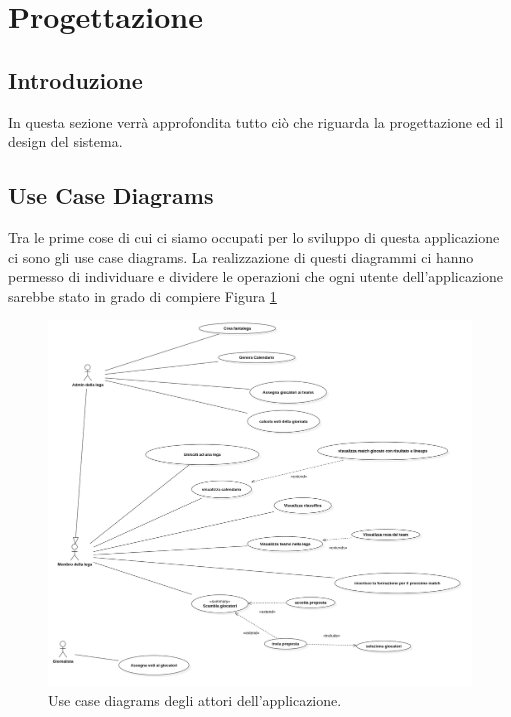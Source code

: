 \section{Progettazione}
\subsection{Introduzione}
In questa sezione verrà approfondita tutto ciò che riguarda la progettazione ed
il design del sistema.
\subsection{Use Case Diagrams}
Tra le prime cose di cui ci siamo occupati per lo sviluppo di questa applicazione
ci sono gli use case diagrams. La realizzazione di questi diagrammi ci hanno permesso
di individuare e dividere le operazioni che ogni utente dell'applicazione sarebbe stato
in grado di compiere Figura \ref{fig:Use case diagrams}
\begin{figure}
    \centering
    \includegraphics[width=\textwidth]{Resources/graficiUML/UseCaseDiagram.png}        
    \caption{Use case diagrams degli attori dell'applicazione.}
    \label{fig:Use case diagrams}
\end{figure}

